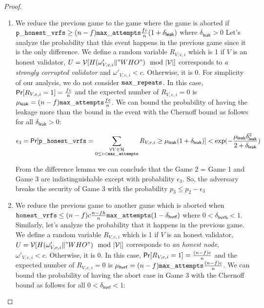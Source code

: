 \begin{proof}
\begin{enumerate}[label={{Game }}{{\arabic*}}]
	\item We reduce the previous game to the game where the game is aborted if $ \mathtt{p\_honest\_vrfs} \geq  (n-f)\mathtt{max\_attempts} \frac{fc}{n} (1+\delta_{\mathsf{leak}})  $ where  $ \delta_{\mathsf{leak}} > 0 $  Let's analyze the probability that this event happens in the previous game since it is the only difference. We define a random variable $ R_{V,e,i} $ which is 1 if $ V $ is an honest validator, $ U = \mathcal{V}[H(\omega'_{V,e,i} \| "WHO") \mod |\mathcal{V}|]  $ corresponds to \emph{a strongly corrupted validator} and  $ \omega'_{V,e,i} < c $. Otherwise, it is 0. For simplicity of our analysis, we do not consider $ \mathtt{max\_repeats} $. In this case, $ \mathsf{Pr}[R_{V,e,i} = 1] = \frac{fc}{n}$ 
	and
	the expected number of $ R_{V,e,i}  = 0$ is  $ \mu_{\mathsf{leak}} = (n-f) \mathtt{max\_attempts} \frac{fc}{n} $. We can bound the probability of having the leakage more than the bound in the event with the Chernoff bound as follows for all $ \delta_{\mathsf{leak}} > 0 	 $:
	
	\begin{equation}\label{eq:beforeepcoh}
	\epsilon_3 = \mathsf{Pr}[ \mathtt{p\_honest\_vrfs} = \sum_{\substack{ \forall V \in \mathcal{H} \\0\leq i < \mathtt{max\_attempts}}} R_{V,e,i} \geq \mu_{\mathsf{leak}} (1+ \delta_{\mathsf{leak}})] < \exp(-\frac{\mu_{\mathsf{leak}}\delta_{\mathsf{leak}}^2}{2+\delta_{\mathsf{leak}}}) \nonumber
	\end{equation}
	
	From the difference lemma we can conclude that the Game 2 = Game 1 and Game 3 are indistinguishable except with probability $ \epsilon_3 $. So, the adversary breaks the security of Game 3 with the probability $ p_3 \leq  p_2 - \epsilon_3 $
	
	
	\item We reduce the previous game to another game which is aborted when $ \mathtt{honest\_vrfs} \leq (n-f)c \frac{n-fh}{n} \mathtt{max\_attempts} (1- \delta_{\mathsf{hvrf}}) $ where $ 0 < \delta_{\mathsf{hvrfs}} < 1 $. Similarly, let's analyze the probability that it happens in the previous game. We define a random variable $ R_{V,e,i} $ which is 1 if $ V $ is an honest validator, $ U = \mathcal{V}[H(\omega'_{V,e,i} \| "WHO") \mod |\mathcal{V}|]  $ corresponds to  \emph{an honest node}, $ \omega'_{V,e,i} < c $. Otherwise, it is 0.  In this case, $ \mathsf{Pr}[R_{V,e,i} = 1] = \frac{(n-f)c}{n}$ and
	the expected number of $ R_{V,e,i}  = 0$ is  $ \mu_{\mathsf{hvrf}} = (n-f) \mathtt{max\_attempts} \frac{(n-f)c}{n} $. We can bound the probability of having the abort case in Game 3 with the Chernoff bound as follows for all $ 0 <\delta_{\mathsf{hvrf}} < 1 	 $:
	

\end{enumerate}
\end{proof}
